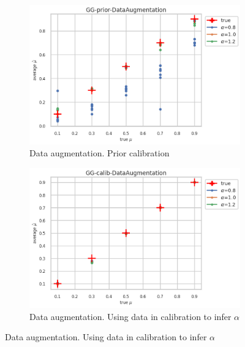 \begin{figure}[ht!]
  \centering
  \begin{subfigure}[t]{0.49\linewidth}
    \includegraphics[width=\linewidth]{COMPARE/GG-prior/DataAugmentation/profusion_true_mu_target_mean.png}
    \caption{Data augmentation. Prior calibration}
  \end{subfigure}%
  \hfill
  \begin{subfigure}[t]{0.49\linewidth}
    \includegraphics[width=\linewidth]{COMPARE/GG-calib/DataAugmentation/profusion_true_mu_target_mean.png}
    \caption{Data augmentation. Using data in calibration to infer $\alpha$}
  \end{subfigure}


\end{figure}
